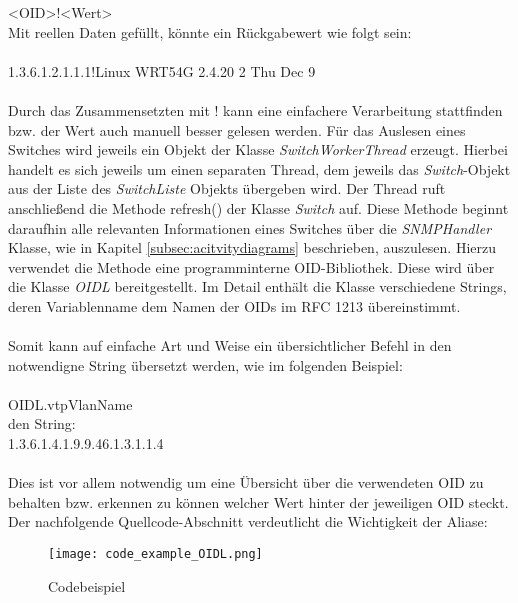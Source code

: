 <OID>!<Wert>\\

Mit reellen Daten gefüllt, könnte ein Rückgabewert wie folgt sein:\\
\\
1.3.6.1.2.1.1.1!Linux WRT54G 2.4.20 2 Thu Dec 9\\
\\
Durch das Zusammensetzten mit ! kann eine einfachere Verarbeitung stattfinden bzw. der Wert auch manuell besser gelesen werden.
Für das Auslesen eines Switches wird jeweils ein Objekt der Klasse \textit{SwitchWorkerThread} erzeugt. Hierbei handelt es sich jeweils um einen separaten Thread, dem jeweils das \textit{Switch}-Objekt aus der Liste des \textit{SwitchListe} Objekts übergeben wird.
Der Thread ruft anschließend die Methode refresh() der Klasse \textit{Switch} auf.
Diese Methode beginnt daraufhin alle relevanten Informationen eines Switches über die \textit{SNMPHandler} Klasse, wie in Kapitel \ref{subsec:acitvitydiagrams} beschrieben, auszulesen.
Hierzu verwendet die Methode eine programminterne OID-Bibliothek. Diese wird über die Klasse \textit{OIDL} bereitgestellt. Im Detail enthält die Klasse verschiedene Strings, deren Variablenname dem Namen der OIDs im RFC 1213 übereinstimmt.\\\\
Somit kann auf einfache Art und Weise ein übersichtlicher Befehl in den notwendigne String übersetzt werden, wie im folgenden Beispiel:\\
\\
OIDL.vtpVlanName\\
den String:\\
1.3.6.1.4.1.9.9.46.1.3.1.1.4\\
\\
Dies ist vor allem notwendig um eine Übersicht über die verwendeten OID zu behalten bzw. erkennen zu können welcher Wert hinter der jeweiligen OID steckt. Der nachfolgende Quellcode-Abschnitt verdeutlicht die Wichtigkeit der Aliase:\\

\begin{figure}[H]
\centering
\texttt{[image: code\_example\_OIDL.png]}
\caption{Codebeispiel}
\label{fig:classdiagramcode}
\end{figure}

